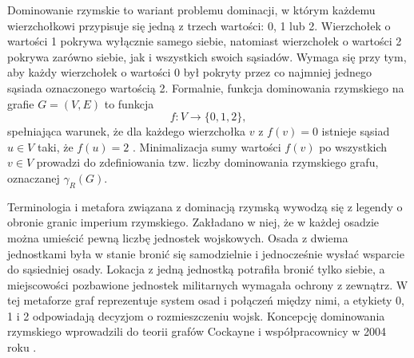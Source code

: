 Dominowanie rzymskie to wariant problemu dominacji, w którym każdemu wierzchołkowi przypisuje się jedną z trzech wartości: 0, 1 lub 2. Wierzchołek o wartości 1 pokrywa wyłącznie samego siebie, natomiast wierzchołek o wartości 2 pokrywa zarówno siebie, jak i wszystkich swoich sąsiadów. Wymaga się przy tym, aby każdy wierzchołek o wartości 0 był pokryty przez co najmniej jednego sąsiada oznaczonego wartością 2. Formalnie, funkcja dominowania rzymskiego na grafie $G=(V,E)$ to funkcja
\[
f: V \to \{0,1,2\},
\]
spełniająca warunek, że dla każdego wierzchołka $v$ z $f(v) = 0$ istnieje sąsiad $u \in V$ taki, że $f(u) = 2$ \cite{Favaron2009}. Minimalizacja sumy wartości $f(v)$ po wszystkich $v \in V$ prowadzi do zdefiniowania tzw. liczby dominowania rzymskiego grafu, oznaczanej $\gamma_R(G)$.

Terminologia i metafora związana z dominacją rzymską wywodzą się z legendy o obronie granic imperium rzymskiego. Zakładano w niej, że w każdej osadzie można umieścić pewną liczbę jednostek wojskowych. Osada z dwiema jednostkami była w stanie bronić się samodzielnie i jednocześnie wysłać wsparcie do sąsiedniej osady. Lokacja z jedną jednostką potrafiła bronić tylko siebie, a miejscowości pozbawione jednostek militarnych wymagała ochrony z zewnątrz. W tej metaforze graf reprezentuje system osad i połączeń między nimi, a etykiety 0, 1 i 2 odpowiadają decyzjom o rozmieszczeniu wojsk. Koncepcję dominowania rzymskiego wprowadzili do teorii grafów Cockayne i współpracownicy w 2004 roku \cite{Cockayne2004}.


